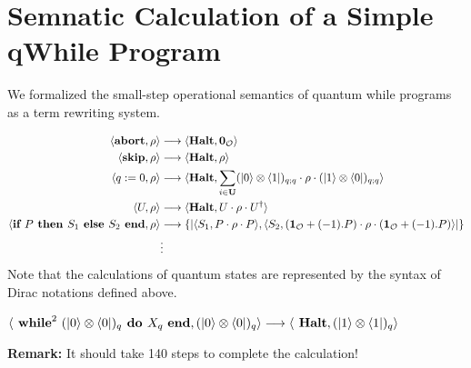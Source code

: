 \documentclass[manuscript, review, timestamp]{acmart}
\begin{document}
\section{Semnatic Calculation of a Simple qWhile Program}
We formalized the small-step operational semantics of quantum while programs as a term rewriting system.
\begin{definition}
  \begin{align*}
    \langle \textbf{abort}, \rho \rangle &\longrightarrow \langle \textbf{Halt}, \textbf{0}_\mathcal{O} \rangle \\
    \langle \textbf{skip}, \rho \rangle &\longrightarrow \langle \textbf{Halt}, \rho \rangle \\
    \langle q :=0, \rho \rangle &\longrightarrow \langle \textbf{Halt}, \sum_{i \in \textbf{U}} (\ket{0}\otimes\bra{1})_{q;q} \cdot \rho \cdot (\ket{1}\otimes\bra{0})_{q;q} \rangle \\
    \langle U, \rho \rangle & \longrightarrow \langle \textbf{Halt}, U \cdot \rho \cdot U^\dagger \rangle \\
    \langle \textbf{if } P \textbf{ then } S_1 \textbf{ else } S_2 \textbf{ end}, \rho \rangle &\longrightarrow \{| \langle S_1, P \cdot \rho \cdot P \rangle, \langle S_2, (\mathbf{1}_\mathcal{O} + (-1).P) \cdot \rho \cdot (\mathbf{1}_\mathcal{O} + (-1).P)\rangle |\} \\
     & \vdots
  \end{align*}
  Note that the calculations of quantum states are represented by the syntax of Dirac notations defined above.
\end{definition}

\begin{example}
  $\langle \textbf{ while}^2\ (\ket{0}\otimes\bra{0})_q \textbf{ do } X_q\ \textbf{end}, (\ket{0}\otimes\bra{0})_q \rangle \longrightarrow \langle \textbf{ Halt}, (\ket{1}\otimes\bra{1})_q \rangle$
\end{example}

\textbf{Remark:} It should take 140 steps to complete the calculation!




\end{document}
